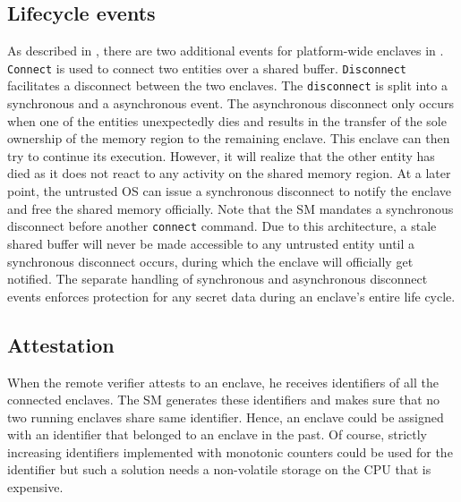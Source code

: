 
\subsection{Lifecycle events}
\label{sec:security:lifecycleevents}
As described in , there are two additional events for platform-wide enclaves in \name{}. \texttt{Connect} is used to connect two entities over a shared buffer. \texttt{Disconnect} facilitates a disconnect between the two enclaves. The \texttt{disconnect} is split into a synchronous and a asynchronous event. The asynchronous disconnect only occurs when one of the entities unexpectedly dies and results in the transfer of the sole ownership of the memory region to the remaining enclave. This enclave can then try to continue its execution. However, it will realize that the other entity has died as it does not react to any activity on the shared memory region. At a later point, the untrusted OS can issue a synchronous disconnect to notify the enclave and free the shared memory officially. Note that the SM mandates a synchronous disconnect before another \texttt{connect} command. Due to this architecture, a stale shared buffer will never be made accessible to any untrusted entity until a synchronous disconnect occurs, during which the enclave will officially get notified. The separate handling of synchronous and asynchronous disconnect events enforces protection for any secret data during an enclave's entire life cycle.

\subsection{Attestation} 

When the remote verifier attests to an enclave, he receives identifiers of all the connected enclaves. The SM generates these identifiers and makes sure that no two running enclaves share same identifier. Hence, an enclave could be assigned with an identifier that belonged to an enclave in the past. Of course, strictly increasing identifiers implemented with monotonic counters could be used for the identifier but such a solution needs a non-volatile storage on the CPU that is expensive. 

